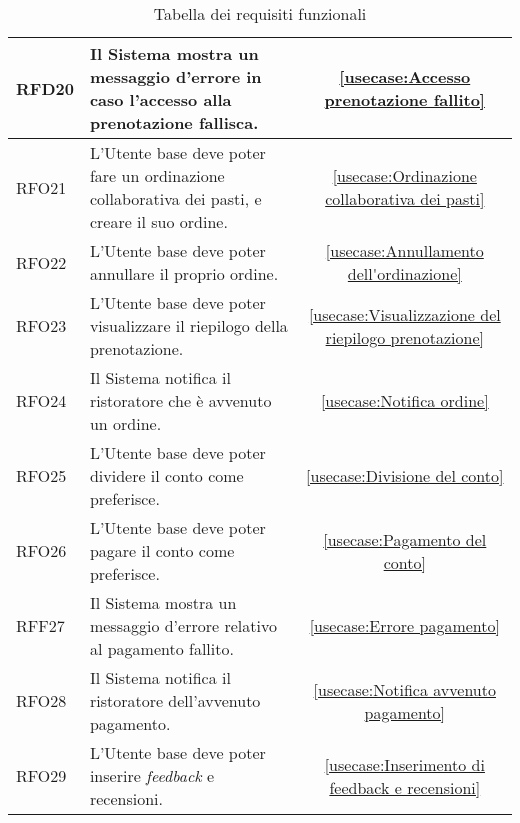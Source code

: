 \begin{table}[H]
\begin{tabularx}{\textwidth}{l|X|c}
		\hline
		RFD20       & Il Sistema mostra un messaggio d'errore in caso l'accesso alla prenotazione fallisca.                          				 &  \autoref{usecase:Accesso prenotazione fallito}           \\
		\hline
		RFO21       & L'Utente base deve poter fare un ordinazione collaborativa dei pasti, e creare il suo ordine.                       			 &  \autoref{usecase:Ordinazione collaborativa dei pasti}           \\
		\hline
		RFO22       & L'Utente base deve poter annullare il proprio ordine.										                    				 &  \autoref{usecase:Annullamento dell'ordinazione}           \\
		\hline
		RFO23       & L'Utente base deve poter visualizzare il riepilogo della prenotazione.                          				 				&  \autoref{usecase:Visualizzazione del riepilogo prenotazione}           \\
		\hline
		RFO24       & Il Sistema notifica il ristoratore che è avvenuto un ordine.                          				 						&  \autoref{usecase:Notifica ordine}           \\
		\hline
		RFO25       & L'Utente base deve poter dividere il conto come preferisce.												       				 &  \autoref{usecase:Divisione del conto}           \\
		\hline
		RFO26       & L'Utente base deve poter pagare il conto come preferisce.												       				 	&  \autoref{usecase:Pagamento del conto}           \\
		\hline
		RFF27       & Il Sistema mostra un messaggio d'errore relativo al pagamento fallito.												       	&  \autoref{usecase:Errore pagamento}           \\
		\hline
		RFO28       & Il Sistema notifica il ristoratore dell'avvenuto pagamento.												       				 &  \autoref{usecase:Notifica avvenuto pagamento}           \\
		\hline
		RFO29       & L'Utente base deve poter inserire \textit{feedback} e recensioni.												       			 &  \autoref{usecase:Inserimento di feedback e recensioni}           \\
		\hline
\end{tabularx}
\caption{Tabella dei requisiti funzionali}
\end{table}


